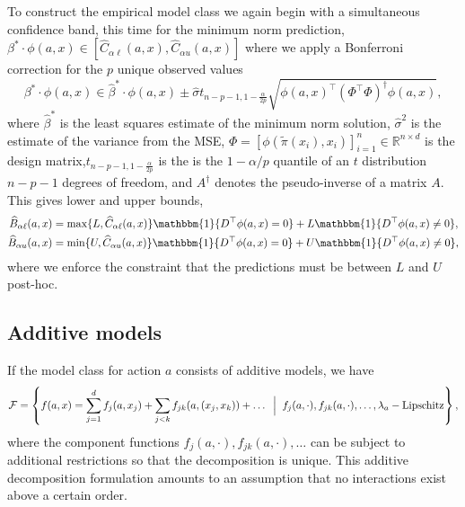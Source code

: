 \documentclass[12pt]{article}
\theoremstyle{definition}
\newcommand{\R}{\ensuremath{\mathbb{R}}}
\newcommand{\bbone}{\ensuremath{\mathbbm{1}}}
\newcommand{\<}{\langle}
\renewcommand{\>}{\rangle}
\newcommand\mcal[1]{\ensuremath{\mathcal{#1}}}
\begin{document}
To construct the empirical model class we again begin with a
simultaneous confidence band, this time for the minimum norm
prediction,
$\beta^\ast \cdot \phi(a,x) \in [\widehat{C}_{\alpha \ell}(a, x),
\widehat{C}_{\alpha u}(a, x)]$
where we apply a Bonferroni correction for the $p$ unique observed values
\begin{equation*}
  \beta^\ast \cdot \phi(a,x) \in \hat{\beta}^\ast \cdot \phi(a,x)  \pm \hat{\sigma} t_{n-p-1, 1 - \frac{\alpha}{2p}}\sqrt{\phi(a, x)^\top(\Phi^\top\Phi)^\dagger\phi(a, x)},
\end{equation*}
where $\hat{\beta}^\ast$ is the least squares estimate of the minimum
norm solution, $\hat{\sigma}^2$ is the estimate of the variance from
the MSE,
$\Phi = [\phi(\tilde{\pi}(x_i), x_i)]_{i=1}^n \in \R^{n \times d}$ is
the design matrix,$t_{n-p-1, 1 - \frac{\alpha}{2p}}$ is the
is the $1 - \alpha / p$ quantile of an $t$ distribution $n-p-1$
degrees of freedom, and $A^\dagger$ denotes the pseudo-inverse of a
matrix $A$. This gives lower and upper bounds,
\begin{equation*}
  \begin{aligned}
    \widehat{B}_{\alpha\ell}(a,x) & =
    \max\{L, \widehat{C}_{\alpha \ell}(a,x)\}\bbone\{D^\top\phi(a,x) = 0\} + L \bbone\{D^\top\phi(a,x) \neq 0\},\\
    \widehat{B}_{\alpha u}(a,x) & = \min\{U, \widehat{C}_{\alpha u}(a,
    x)\} \bbone\{D^\top\phi(a,x) = 0\} + U \bbone\{D^\top\phi(a,x) \neq
    0\},
  \end{aligned}
\end{equation*}
where we enforce the constraint that the predictions must be between $L$ and $U$ post-hoc.


\subsection{Additive models}
\label{ex:add}

If the model class for action $a$ consists of additive models, we have
\begin{equation*}
  \mcal{F} = \left\{f(a, x) = \sum_{j=1}^d f_j(a,x_j) + \sum_{j < k}
    f_{jk}(a, (x_j, x_k)) + \ldots \;\; \Bigl | \;\; f_{j}(a,\cdot), f_{jk}(a, \cdot), \ldots, \lambda_a-\text{Lipschitz}\right\},
\end{equation*}
where the component functions
$f_{j}(a,\cdot), f_{jk}(a, \cdot), \ldots$ can be subject to
additional restrictions so that the decomposition is unique.  This
additive decomposition formulation amounts to an assumption that no
interactions exist above a certain order.
\end{document}
